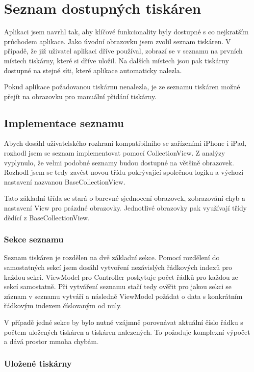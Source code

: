 \section{Seznam dostupných tiskáren}

Aplikaci jsem navrhl tak, aby klíčové funkcionality byly dostupné s co nejkratším průchodem aplikace.
Jako úvodní obrazovku jsem zvolil seznam tiskáren.
V případě, že již uživatel aplikaci dříve používal, zobrazí se v seznamu na prvních místech tiskárny, které si dříve uložil.
Na dalších místech jsou pak tiskárny dostupné na stejné síti, které aplikace automaticky nalezla.

Pokud aplikace požadovanou tiskárnu nenalezla, je ze seznamu tiskáren možné přejít na obrazovku pro manuální přidání tiskárny.

\subsection{Implementace seznamu}

Abych dosáhl uživatelského rozhraní kompatibilního se zařízeními iPhone i iPad, rozhodl jsem se seznam implementovat pomocí CollectionView.
Z analýzy vyplynulo, že velmi podobné seznamy budou dostupné na většině obrazovek.
Rozhodl jsem se tedy zavést novou třídu pokrývající společnou logiku a výchozí nastavení nazvanou BaseCollectionView.

Tato základní třída se stará o barevné sjednocení obrazovek, zobrazování chyb a nastavení View pro prázdné obrazovky.
Jednotlivé obrazovky pak využívají třídy dědící z BaseCollectionView.

\subsubsection*{Sekce seznamu}

Seznam tiskáren je rozdělen na dvě základní sekce.
Pomocí rozdělení do samostatných sekcí jsem dosáhl vytvoření nezávislých řádkových indexů pro každou sekci.
ViewModel pro Controller poskytuje počet řádků pro každou ze sekcí samostatně.
Při vytváření seznamu stačí tedy ověřit pro jakou sekci se záznam v seznamu vytváří a následně ViewModel požádat o data s konkrátním řádkovým indexem číslovaným od nuly.

V případě jedné sekce by bylo nutné vzájmně porovnávat aktuální číslo řádku s počtem uložených tiskáren a tiskáren nalezených.
To požaduje komplexní výpočet a dává prostor mmoha chybám.

\subsubsection*{Uložené tiskárny}

